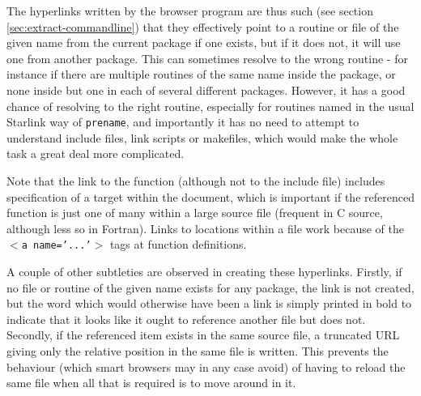 \documentclass[twoside,11pt]{article}
\renewcommand{\_}{\texttt{\symbol{95}}}
\begin{document}
The hyperlinks written by the browser program are thus such
(see section \ref{sec:extract-commandline})
that they effectively point to a routine or file of the given name from
the current package if one exists, but if it does not, it will
use one from another package.
This can sometimes resolve to the wrong routine - for instance
if there are multiple routines of the same name inside the
package, or none inside but one in each of several different packages.
However, it has a good chance of resolving to the right routine,
especially for routines named in the usual Starlink way of
{\tt pre\_name}, and importantly it has no need to attempt to 
understand include files, link scripts or makefiles, which 
would make the whole task a great deal more complicated.

Note that the link to the function (although not to the include file)
includes specification of a target within the document, 
which is important if the referenced function is just one of many within a
large source file (frequent in C source, although less so in Fortran).
Links to locations within a file work because of the
{\tt $<$a name='...'$>$} tags at function definitions.

A couple of other subtleties are observed in creating these hyperlinks.
Firstly, if no file or routine of the given name exists for any package,
the link is not created, but the word which would otherwise have
been a link is simply printed in bold to indicate that it looks
like it ought to reference another file but does not.
Secondly, if the referenced item exists in the same source file,
a truncated URL giving only the relative position in the same
file is written.  This prevents the behaviour (which smart browsers
may in any case avoid) of having to reload the same file when all
that is required is to move around in it.
\end{document}
